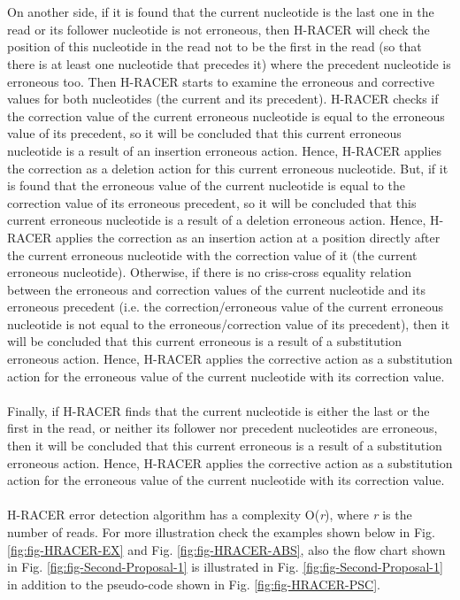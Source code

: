\documentclass[12pt,openany]{llncs}
\begin{document}
\\
\\
On another side, if it is found that the current nucleotide is the last one in the read or its follower nucleotide is not erroneous, then H-RACER will check the position of this nucleotide in the read not to be the first in the read (so that there is at least one nucleotide that precedes it) where the precedent nucleotide is erroneous too. Then H-RACER starts to examine the erroneous and corrective values for both nucleotides (the current and its precedent). H-RACER checks if the correction value of the current erroneous nucleotide is equal to the erroneous value of its precedent, so it will be concluded that this current erroneous nucleotide is a result of an insertion erroneous action. Hence, H-RACER applies the correction as a deletion action for this current erroneous nucleotide. But, if it is found that the erroneous value of the current nucleotide is equal to the correction value of its erroneous precedent, so it will be concluded that this current erroneous nucleotide is a result of a deletion erroneous action. Hence, H-RACER applies the correction as an insertion action at a position directly after the current erroneous nucleotide with the correction value of it (the current erroneous nucleotide). Otherwise, if there is no criss-cross equality relation between the erroneous and correction values of the current nucleotide and its erroneous precedent (i.e. the correction/erroneous value of the current erroneous nucleotide is not equal to the erroneous/correction value of its precedent), then it will be concluded that this current erroneous is a result of a substitution erroneous action. Hence, H-RACER applies the corrective action as a substitution action for the erroneous value of the current nucleotide with its correction value.
\\
\\
Finally, if H-RACER finds that the current nucleotide is either the last or the first in the read, or neither its follower nor precedent nucleotides are erroneous, then it will be concluded that this current erroneous is a result of a substitution erroneous action. Hence, H-RACER applies the corrective action as a substitution action for the erroneous value of the current nucleotide with its correction value.
\\
\\
H-RACER error detection algorithm has a complexity O(\textit{r}), where \textit{r} is the number of reads. For more illustration check the examples shown below in Fig. \ref{fig:fig-HRACER-EX} and Fig. \ref{fig:fig-HRACER-ABS}, also the flow chart shown in Fig. \ref{fig:fig-Second-Proposal-1} is illustrated in Fig. \ref{fig:fig-Second-Proposal-1} in addition to the pseudo-code shown in Fig. \ref{fig:fig-HRACER-PSC}.
\end{document}
